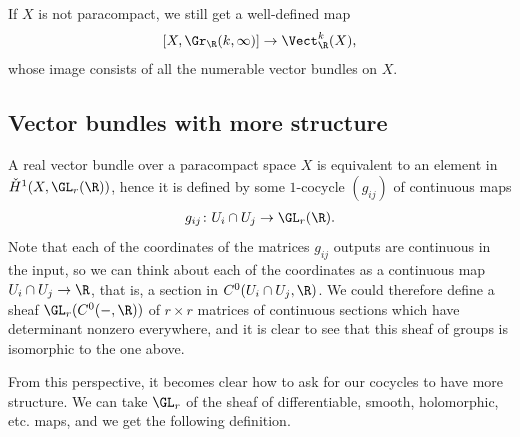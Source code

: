 \documentclass[11pt]{book}
\begin{document}
\begin{remark} If $X$ is not paracompact, we still get a well-defined map
\begin{align*}
    \left[ X,\Gr_\R(k,\infty) \right] \to \Vect_\R^k(X),
\end{align*}
whose image consists of all the numerable vector bundles on $X$.
\end{remark}



\subsection{Vector bundles with more structure}

A real vector bundle over a paracompact space $X$ is equivalent to an element in $\check{H}^1(X,\GL_r(\R))$, hence it is defined by some $1$-cocycle $(g_{ij})$ of continuous maps
\begin{align*}
    g_{ij} \colon U_i \cap U_j \to \GL_r(\R).
\end{align*}
Note that each of the coordinates of the matrices $g_{ij}$ outputs are continuous in the input, so we can think about each of the coordinates as a continuous map $U_i \cap U_j \to \R$, that is, a section in $C^0(U_i\cap U_j, \R)$. We could therefore define a sheaf $\GL_r(C^0(-,\R))$ of $r \times r$ matrices of continuous sections which have determinant nonzero everywhere, and it is clear to see that this sheaf of groups is isomorphic to the one above.

From this perspective, it becomes clear how to ask for our cocycles to have more structure. We can take $\GL_r$ of the sheaf of differentiable, smooth, holomorphic, etc. maps, and we get the following definition.
\end{document}
